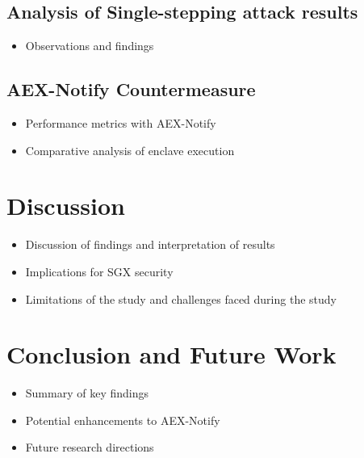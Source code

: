 \documentclass{llncs}
\begin{document}
\subsection{Analysis of Single-stepping attack results}
\begin{itemize}
    \item Observations and findings
\end{itemize}
\subsection{AEX-Notify Countermeasure}
\begin{itemize}
    \item Performance metrics with AEX-Notify
    \item Comparative analysis of enclave execution
\end{itemize}

\section{Discussion}
\begin{itemize}
  \item Discussion of findings and interpretation of results
  \item Implications for SGX security
  \item Limitations of the study and challenges faced during the study
\end{itemize}

\section{Conclusion and Future Work}
\begin{itemize}
    \item Summary of key findings
    \item Potential enhancements to AEX-Notify
    \item Future research directions
\end{itemize}


%

\end{document}
